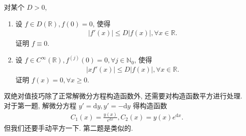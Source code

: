 \documentclass[../../main.tex]{subfiles}
\begin{document}
\begin{example}\label{example:双绝对值经典问题}
对某个 $D > 0$,
\begin{enumerate}
\item 设 $f\in D(\mathbb{R}),f(0)=0$, 使得
\begin{align}\label{equation-----1229}
|f'(x)|\leqslant D|f(x)|,\forall x\in\mathbb{R}.
\end{align}
证明 $f\equiv0$.

\item 设 $f\in C^\infty(\mathbb{R}),f^{(j)}(0)=0,\forall j\in\mathbb{N}_0$, 使得
\begin{align}\label{equation-----1230}
|xf'(x)|\leqslant D|f(x)|,\forall x\in\mathbb{R}.
\end{align}
证明 $f(x)=0,\forall x\geqslant0$.
\end{enumerate}
\end{example}
\begin{note}
双绝对值技巧除了正常解微分方程构造函数外, 还需要对构造函数平方进行处理. 对于第一题, 解微分方程 $y' = \mathrm{d}y,y' = -\mathrm{d}y$ 得构造函数
\begin{align*}
C_1(x)=\frac{y(x)}{e^{\mathrm{d}x}},C_2(x)=y(x)e^{\mathrm{d}x}.
\end{align*}
但我们还要手动平方一下. 第二题是类似的.
\end{note}
\end{document}
